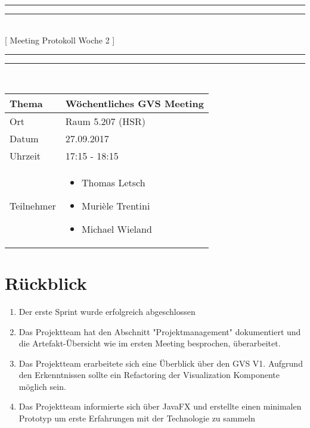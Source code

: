 \documentclass[11pt, a4paper,oneside]{scrartcl}
\begin{document}
\centering
\rule{\textwidth}{1.6pt}\vspace*{-\baselineskip}\vspace*{2pt} %
\rule{\textwidth}{0.4pt}\\[\baselineskip] %
{\LARGE [ Meeting Protokoll Woche 2 ]}\\[0.2\baselineskip] %
\rule{\textwidth}{0.4pt}\vspace*{-\baselineskip}\vspace{3.2pt} %
\rule{\textwidth}{1.6pt}\\[2\baselineskip] %

\begin{tabu} to \linewidth {l X }
	\toprule
	\textbf{Thema} & \textbf{Wöchentliches GVS Meeting} \\
	\midrule
	Ort & Raum 5.207 (HSR) \\
	Datum & 27.09.2017 \\
	Uhrzeit & 17:15 - 18:15 \\
	Teilnehmer & 
	\begin{minipage}[t]{\textwidth}
	  	\begin{itemize}
	  		\item Thomas Letsch
			\item Murièle Trentini
			\item Michael Wieland
	  	\end{itemize}
	\end{minipage}
	\\
	\bottomrule
\end{tabu}


\section{Rückblick}
\begin{enumerate}
	\item Der erste Sprint wurde erfolgreich abgeschlossen 
	\item Das Projektteam hat den Abschnitt "Projektmanagement" dokumentiert und die Artefakt-Übersicht wie im ersten Meeting besprochen, überarbeitet.
	\item Das Projektteam erarbeitete sich eine Überblick über den GVS V1. Aufgrund den Erkenntnissen sollte ein Refactoring der Visualization Komponente möglich sein. 
	\item Das Projektteam informierte sich über JavaFX und erstellte einen minimalen Prototyp um erste Erfahrungen mit der Technologie zu sammeln
\end{enumerate}
\end{document}
